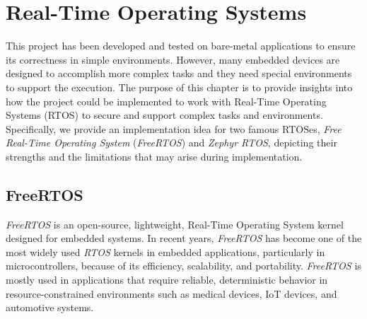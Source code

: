 \chapter{Real-Time Operating Systems}
\label{cha:rtos}

This project has been developed and tested on bare-metal applications to ensure
its correctness in simple environments. However, many embedded devices are
designed to accomplish more complex tasks and they need special environments to
support the execution. The purpose of this chapter is to provide insights into how
the project could be implemented to work with Real-Time Operating Systems (RTOS)
to secure and support complex tasks and environments. Specifically, we provide an
implementation idea for two famous RTOSes, \textit{Free Real-Time Operating
System} (\textit{FreeRTOS}) and \textit{Zephyr RTOS}, depicting their strengths
and the limitations that may arise during implementation.

\section{FreeRTOS}
\label{sec:rtos_rtos}

\textit{FreeRTOS}\cite{freertos} is an open-source, lightweight, Real-Time Operating
System kernel designed for embedded systems. In recent years, \textit{FreeRTOS}
has become one of the most widely used \textit{RTOS} kernels in embedded applications,
particularly in microcontrollers, because of its efficiency, scalability, and portability.
\textit{FreeRTOS} is mostly used in applications that require reliable,
deterministic behavior in resource-constrained environments such as medical
devices, IoT devices, and automotive systems.

